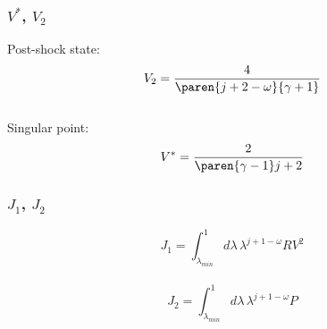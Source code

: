 %
\begin{frame}\frametitle{$V^{*}$, $V_{2}$}
\center
Post-shock state:
\begin{equation}
	V_{2} = \frac{4}{\paren{j+2-\omega}{\gamma+1}}	
\label{eq:v2}
\end{equation}
\ \\[20pt]
Singular point:
\begin{equation}
	V^{*} = \frac{2}{\paren{ \gamma - 1 }j+2}	
\label{eq:vstar}
\end{equation}
\end{frame}
%
\begin{frame}\frametitle{$J_{1}$, $J_{2}$}
\center
\begin{equation}
	J_{1} = \int_{\lambda_{min}}^{1} d\lambda\, \lambda^{j+1-\omega}R V^{2}	
\label{eq:j1}
\end{equation}
\ \\
\begin{equation}
	J_{2} = \int_{\lambda_{min}}^{1} d\lambda\, \lambda^{j+1-\omega} P	
\label{eq:j2}
\end{equation}
\end{frame}

%
\endinput  %
